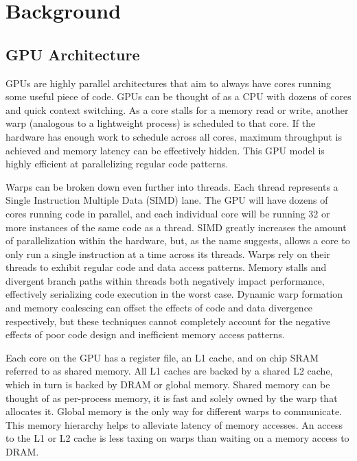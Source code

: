 \chapter{Background}

\section{GPU Architecture}
GPUs are highly parallel architectures that aim to always have cores running some useful piece of code. GPUs can be thought of as a CPU with dozens of cores and quick context switching. As a core stalls for a memory read or write, another warp (analogous to a lightweight process) is scheduled to that core. If the hardware has enough work to schedule across all cores, maximum throughput is achieved and memory latency can be effectively hidden. This GPU model is highly efficient at parallelizing regular code patterns.

Warps can be broken down even further into threads. Each thread represents a Single Instruction Multiple Data (SIMD) lane. The GPU will have dozens of cores running code in parallel, and each individual core will be running 32 or more instances of the same code as a thread. SIMD greatly increases the amount of parallelization within the hardware, but, as the name suggests, allows a core to only run a single instruction at a time across its threads. Warps rely on their threads to exhibit regular code and data access patterns. Memory stalls and divergent branch paths within threads both negatively impact performance, effectively serializing code execution in the worst case. Dynamic warp formation \cite{dynamicwarp1,dynamicwarp2} and memory coalescing can offset the effects of code and data divergence respectively, but these techniques cannot completely account for the negative effects of poor code design and inefficient memory access patterns.

Each core on the GPU has a register file, an L1 cache, and on chip SRAM referred to as shared memory. All L1 caches are backed by a shared L2 cache, which in turn is backed by DRAM or global memory. Shared memory can be thought of as per-process memory, it is fast and solely owned by the warp that allocates it. Global memory is the only way for different warps to communicate. This memory hierarchy helps to alleviate latency of memory accesses. An access to the L1 or L2 cache is less taxing on warps than waiting on a memory access to DRAM.

